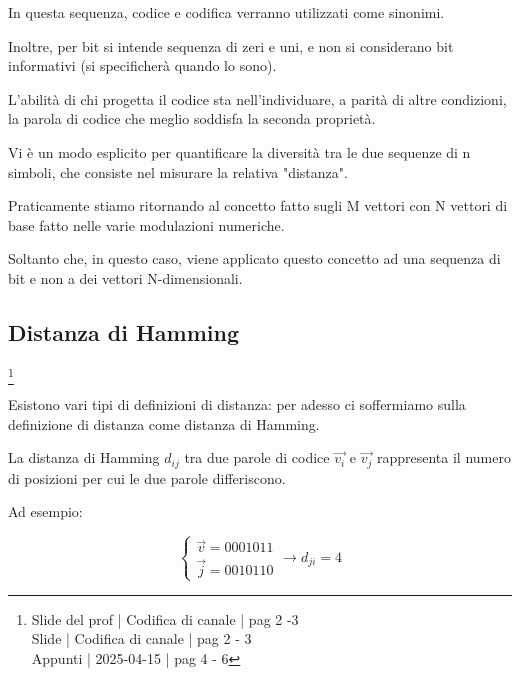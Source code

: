 \begin{tcolorbox}
In questa sequenza, codice e codifica verranno utilizzati come sinonimi. \newline 

Inoltre, per bit si intende sequenza di zeri e uni, e non si considerano bit informativi (si specificherà quando lo sono). 
\end{tcolorbox}

L'abilità di chi progetta il codice sta nell'individuare, 
a parità di altre condizioni, la parola di codice che meglio soddisfa la seconda proprietà. \newline 

Vi è un modo esplicito per quantificare la diversità tra le due sequenze di n simboli, 
che consiste nel misurare la relativa "distanza". \newline 

\begin{tcolorbox}
    Praticamente stiamo ritornando al concetto fatto sugli M vettori con N vettori di base fatto nelle varie modulazioni numeriche. \newline 

    Soltanto che, in questo caso, viene applicato questo concetto ad una sequenza di bit e non a dei vettori N-dimensionali. 
\end{tcolorbox}

\newpage 

\subsection{Distanza di Hamming}
\footnote{Slide del prof | Codifica di canale | pag 2 -3 \\ 
Slide | Codifica di canale | pag  2 - 3\\ 
Appunti | 2025-04-15 | pag 4 - 6
} 

Esistono vari tipi di definizioni di distanza: per adesso ci soffermiamo sulla definizione di distanza come distanza di Hamming. \newline 

La distanza di Hamming $d_{ij}$ tra due parole di codice $\overrightarrow{v_i}$ e $\overrightarrow{v_j}$ 
rappresenta il numero di posizioni per cui le due parole differiscono. \newline 

Ad esempio: 

{
    \Large 
    \begin{equation}
        \begin{cases}
        \overrightarrow{v} = 0001011
        \\
        \overrightarrow{j} = 0010110
    \end{cases}
    \to 
    d_{ji} = 4
    \end{equation}
} 


